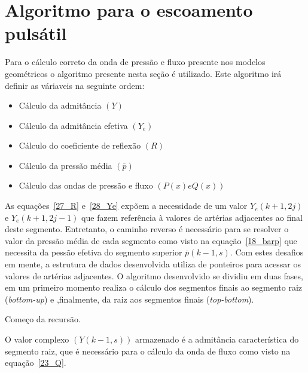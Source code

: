 \documentclass[
        english,			
        brazil			        %
        ,<...>]{abntbibufjf}
\begin{document}
\section{Algoritmo para o escoamento pulsátil}
\label{sec:algoritmo}

Para o cálculo correto da onda de pressão e fluxo presente nos modelos geométricos o algoritmo presente nesta seção é utilizado. Este algoritmo irá definir as váriaveis na seguinte ordem:

\begin{itemize}
    \item Cálculo da admitância $(Y)$
    \item Cálculo da admitância efetiva $(Y_e)$
    \item Cálculo do coeficiente de reflexão $(R)$
    \item Cálculo da pressão média $(\bar{p})$
    \item Cálculo das ondas de pressão e fluxo $(P(x) e Q(x))$
\end{itemize}

As equações~\eqref{27_R} e~\eqref{28_Ye} expõem a necessidade de um valor $Y_e(k+1,2j)$ e $Y_e(k+1,2j-1)$ que fazem referência à valores de artérias adjacentes ao final deste segmento.
Entretanto, o caminho reverso é necessário para se resolver o valor da pressão média de cada segmento como visto na equação~\eqref{18_barp} que necessita da pessão efetiva do segmento superior $\bar{p}(k-1,s)$.
Com estes desafios em mente, a estrutura de dados desenvolvida utiliza de ponteiros para acessar os valores de artérias adjacentes. O algoritmo desenvolvido se dividiu em duas fases, em um primeiro momento realiza o cálculo dos segmentos finais ao segmento raiz (\textit{bottom-up}) e ,finalmente, da raiz aos segmentos finais (\textit{top-bottom}).


\begin{algorithm}[H]
	\SetAlgoLined
\caption{Começo da recursão.}
\end{algorithm}

O valor complexo $(Y(k-1,s))$ armazenado é a admitância característica do segmento raiz, que é necessário para o cálculo da onda de fluxo como visto na equação~\eqref{23_Q}.
\end{document}
